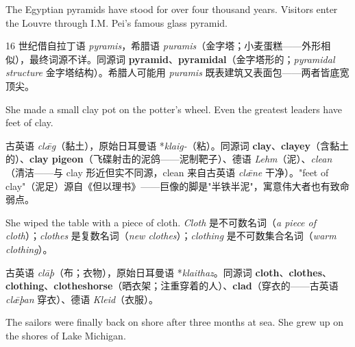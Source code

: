\documentclass[../main.tex]{subfiles}
\begin{document}


{The Egyptian pyramids have stood for over four thousand years.}
{Visitors enter the Louvre through I.M. Pei's famous glass pyramid.}

\begin{origin}
16 世纪借自拉丁语 \textit{pyramis}，希腊语 \textit{puramis}（金字塔；小麦蛋糕——外形相似），最终词源不详。同源词 \textbf{pyramid}、\textbf{pyramidal}（金字塔形的；\textit{pyramidal structure} 金字塔结构）。希腊人可能用 \textit{puramis} 既表建筑又表面包——两者皆底宽顶尖。
\end{origin}


{She made a small clay pot on the potter's wheel.}
{Even the greatest leaders have feet of clay.}

\begin{origin}
古英语 \textit{clǣg}（黏土），原始日耳曼语 *\textit{klaig-}（粘）。同源词 \textbf{clay}、\textbf{clayey}（含黏土的）、\textbf{clay pigeon}（飞碟射击的泥鸽——泥制靶子）、德语 \textit{Lehm}（泥）、\textit{clean}（清洁——与 clay 形近但实不同源，clean 来自古英语 \textit{clǣne} 干净）。"feet of clay"（泥足）源自《但以理书》——巨像的脚是"半铁半泥"，寓意伟大者也有致命弱点。
\end{origin}


{She wiped the table with a piece of cloth.}
{\textit{Cloth} 是不可数名词（\textit{a piece of cloth}）；\textit{clothes} 是复数名词（\textit{new clothes}）；\textit{clothing} 是不可数集合名词（\textit{warm clothing}）。}

\begin{origin}
古英语 \textit{clāþ}（布；衣物），原始日耳曼语 *\textit{klaithaz}。同源词 \textbf{cloth}、\textbf{clothes}、\textbf{clothing}、\textbf{clotheshorse}（晒衣架；注重穿着的人）、\textbf{clad}（穿衣的——古英语 \textit{clǣþan} 穿衣）、德语 \textit{Kleid}（衣服）。
\end{origin}


{The sailors were finally back on shore after three months at sea.}
{She grew up on the shores of Lake Michigan.}
\end{document}
